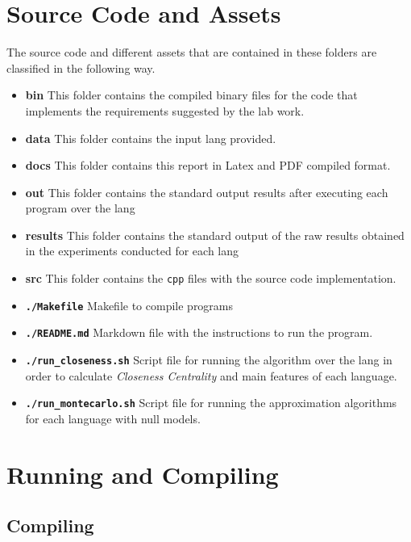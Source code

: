 \documentclass[12pt, a4paper]{article}
\begin{document}
\printglossary[type=\acronymtype]

\appendix\label{apx:org}
\section{Source Code and Assets}
The source code and different assets that are contained in these folders are classified in the following way.

\begin{itemize}
    \item \textbf{bin} This folder contains the compiled binary files for the code that implements the requirements suggested by the lab work.
    \item \textbf{data} This folder contains the input \acrshort{lang} provided.
    \item \textbf{docs} This folder contains this report in Latex and PDF compiled format.
    \item \textbf{out} This folder contains the standard output results after executing each program over the \acrshort{lang}
    \item \textbf{results} This folder contains the standard output of the raw results obtained in the experiments conducted for each \acrshort{lang}
    \item \textbf{src} This folder contains the \texttt{cpp} files with the source code implementation.
    \item \textbf{\texttt{./Makefile}} Makefile to compile programs
    \item \textbf{\texttt{./README.md}} Markdown file with the instructions to run the program.
    \item \textbf{\texttt{./run_closeness.sh}} Script file for running the algorithm over the \acrshort{lang} in order to calculate \textit{Closeness Centrality} and 
    main features of each language.
    \item \textbf{\texttt{./run_montecarlo.sh}} Script file for running the approximation algorithms for each language with null models.
\end{itemize}

\section{Running and Compiling}
\subsection{Compiling}
\end{document}
